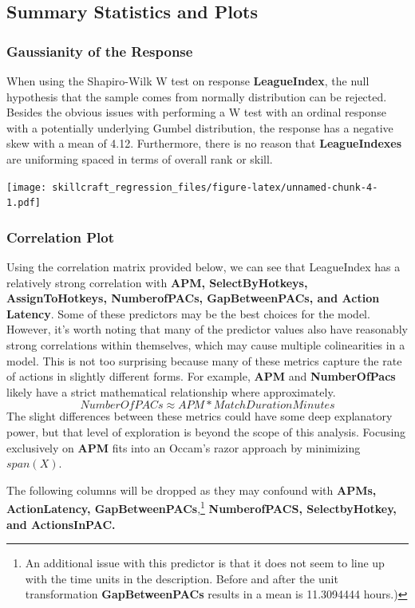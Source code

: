 \documentclass[]{article}
\begin{document}
\hypertarget{summary-statistics-and-plots}{%
\subsection{Summary Statistics and
Plots}\label{summary-statistics-and-plots}}

\hypertarget{gaussianity-of-the-response}{%
\subsubsection{Gaussianity of the
Response}\label{gaussianity-of-the-response}}

When using the Shapiro-Wilk W test on response \textbf{LeagueIndex}, the
null hypothesis that the sample comes from normally distribution can be
rejected. Besides the obvious issues with performing a W test with an
ordinal response with a potentially underlying Gumbel distribution, the
response has a negative skew with a mean of 4.12. Furthermore, there is
no reason that \textbf{LeagueIndexes} are uniforming spaced in terms of
overall rank or skill.

\texttt{[image: skillcraft\_regression\_files/figure-latex/unnamed-chunk-4-1.pdf]}

\hypertarget{correlation-plot}{%
\subsubsection{Correlation Plot}\label{correlation-plot}}

Using the correlation matrix provided below, we can see that LeagueIndex
has a relatively strong correlation with \textbf{APM, SelectByHotkeys,
AssignToHotkeys, NumberofPACs, GapBetweenPACs, and Action Latency}. Some
of these predictors may be the best choices for the model. However, it's
worth noting that many of the predictor values also have reasonably
strong correlations within themselves, which may cause multiple
colinearities in a model. This is not too surprising because many of
these metrics capture the rate of actions in slightly different forms.
For example, \textbf{APM} and \textbf{NumberOfPacs} likely have a strict
mathematical relationship where approximately.
\[NumberOfPACs \approx APM*MatchDurationMinutes\] The slight differences
between these metrics could have some deep explanatory power, but that
level of exploration is beyond the scope of this analysis. Focusing
exclusively on \textbf{APM} fits into an Occam's razor approach by
minimizing \(span(X)\).

The following columns will be dropped as they may confound with
\textbf{APMs, ActionLatency, GapBetweenPACs},\footnote{An additional
  issue with this predictor is that it does not seem to line up with the
  time units in the description. Before and after the unit
  transformation \textbf{GapBetweenPACs} results in a mean is 11.3094444
  hours.)}\textbf{ NumberofPACS, SelectbyHotkey, and ActionsInPAC.}
\end{document}
